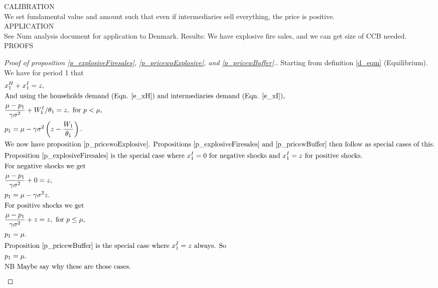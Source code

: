 \documentclass[11pt]{article}
\begin{document}
\begin{appendices}
\newpage

CALIBRATION\\
We set fundamental value and amount such that even if intermediaries sell everything, the price is positive.\\


APPLICATION\\
See Num analysis document for application to Denmark. Results: We have explosive fire sales, and we can get size of CCB needed.\\



PROOFS
\begin{proof}[Proof of proposition \ref{p_explosiveFiresales}, \ref{p_pricewoExplosive}, and \ref{p_pricewBuffer}.]
Starting from definition \ref{d_eqm} (Equilibrium). We have for period 1 that
\begin{align*}
&x^H_1 + x^I_1 = z,\\
&\text{And using the households demand (Eqn. \ref{e_xH}) and intermediaries demand (Eqn. \ref{e_xI}),}\\
&\frac{\mu - p_1}{\gamma\sigma^2} + W^I_1/\theta_1 = z, \text{ for $p<\mu$},\\
&p_1 = \mu - \gamma \sigma^2 \left(z - \frac{W_1}{\theta_1}\right).\\
&\text{We now have proposition \ref{p_pricewoExplosive}. Propositions \ref{p_explosiveFiresales} and \ref{p_pricewBuffer} then follow as special cases of this.}\\
&\text{Proposition \ref{p_explosiveFiresales} is the special case where $x^I_1 = 0$ for negative shocks and $x^I_1 = z$ for positive shocks.}\\
&\text{For negative shocks we get}\\
&\frac{\mu - p_1}{\gamma\sigma^2} + 0 = z,\\
&p_1 = \mu - \gamma\sigma^2 z.\\
&\text{For positive shocks we get}\\
&\frac{\mu - p_1}{\gamma\sigma^2} + z = z, \text{ for $p\leq\mu$},\\
&p_1 = \mu.\\
&\text{Proposition \ref{p_pricewBuffer} is the special case where $x^I_1 = z$ always. So}\\
&p_1 = \mu.\\
&\text{NB Maybe say why these are those cases.}\\
\end{align*}
\end{proof}


\end{appendices}
\end{document}
